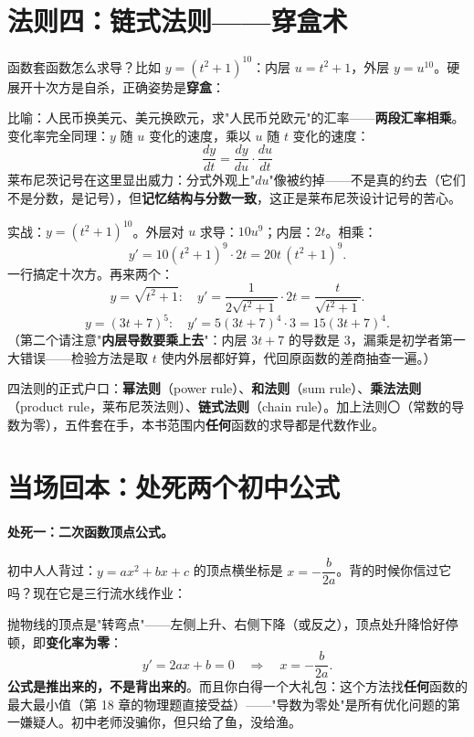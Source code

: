 \section{法则四：链式法则——穿盒术}

函数套函数怎么求导？比如 $y = (t^2+1)^{10}$：内层 $u = t^2+1$，外层 $y = u^{10}$。硬展开十次方是自杀，正确姿势是\textbf{穿盒}：

比喻：人民币换美元、美元换欧元，求"人民币兑欧元"的汇率——\textbf{两段汇率相乘}。变化率完全同理：$y$ 随 $u$ 变化的速度，乘以 $u$ 随 $t$ 变化的速度：
\[
\boxed{\;\frac{dy}{dt} = \frac{dy}{du}\cdot\frac{du}{dt}\;}
\]
莱布尼茨记号在这里显出威力：分式外观上"$du$"像被约掉——不是真的约去（它们不是分数，是记号），但\textbf{记忆结构与分数一致}，这正是莱布尼茨设计记号的苦心。

实战：$y = (t^2+1)^{10}$。外层对 $u$ 求导：$10u^9$；内层：$2t$。相乘：
\[
y' = 10(t^2+1)^9\cdot 2t = 20t\,(t^2+1)^9 .
\]
一行搞定十次方。再来两个：
\[
y = \sqrt{t^2+1}:\quad y' = \frac{1}{2\sqrt{t^2+1}}\cdot 2t = \frac{t}{\sqrt{t^2+1}} .
\]
\[
y = (3t+7)^5:\quad y' = 5(3t+7)^4\cdot 3 = 15(3t+7)^4 .
\]
（第二个请注意"\textbf{内层导数要乘上去}"：内层 $3t+7$ 的导数是 $3$，漏乘是初学者第一大错误——检验方法是取 $t$ 使内外层都好算，代回原函数的差商抽查一遍。）

\begin{cidian}
四法则的正式户口：\textbf{幂法则}（power rule）、\textbf{和法则}（sum rule）、\textbf{乘法法则}（product rule，莱布尼茨法则）、\textbf{链式法则}（chain rule）。加上法则〇（常数的导数为零），五件套在手，本书范围内\textbf{任何}函数的求导都是代数作业。
\end{cidian}

\section{当场回本：处死两个初中公式}

\paragraph{处死一：二次函数顶点公式。}初中人人背过：$y = ax^2 + bx + c$ 的顶点横坐标是 $x = -\dfrac{b}{2a}$。背的时候你信过它吗？现在它是三行流水线作业：

抛物线的顶点是"转弯点"——左侧上升、右侧下降（或反之），顶点处升降恰好停顿，即\textbf{变化率为零}：
\[
y' = 2ax + b = 0 \quad\Longrightarrow\quad x = -\frac{b}{2a} .
\]
\textbf{公式是推出来的，不是背出来的}。而且你白得一个大礼包：这个方法找\textbf{任何}函数的最大最小值（第 18 章的物理题直接受益）——"导数为零处"是所有优化问题的第一嫌疑人。初中老师没骗你，但只给了鱼，没给渔。

